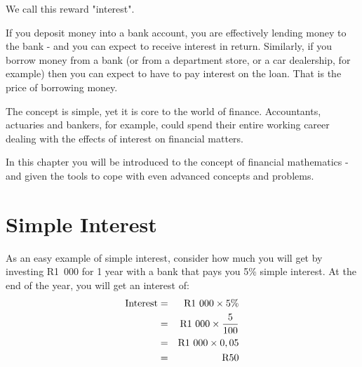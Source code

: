 \documentclass[10pt,a4paper,titlepage,twoside,openright]{report}
\begin{document}
We call this reward "interest".

If you deposit money into a bank account, you are effectively lending money to the bank - and you can expect to receive interest in return. Similarly, if you borrow money from a bank (or from a department store, or a car dealership, for example) then you can expect to have to pay interest on the loan. That is the price of borrowing money.

The concept is simple, yet it is core to the world of finance. Accountants, actuaries and bankers, for example, could spend their entire working career dealing with the effects of interest on financial matters.

In this chapter you will be introduced to the concept of financial mathematics - and given the tools to cope with even advanced concepts and problems.



\section{Simple Interest}
\label{sec:m:f10:simpleinterest}



As an easy example of simple interest, consider how much you will get by investing R1~000 for 1 year with a bank that pays you 5\% simple interest. At the end of the year, you will get an interest of:
\begin{eqnarray*}
\rm{Interest} &=& \rm{R}1~000 \times 5\%\\
&=& \rm{R}1~000 \times\frac{5}{100} \\
&=& \rm{R}1~000 \times 0,05\\
&=& \rm{R}50
\end{eqnarray*}
\end{document}
